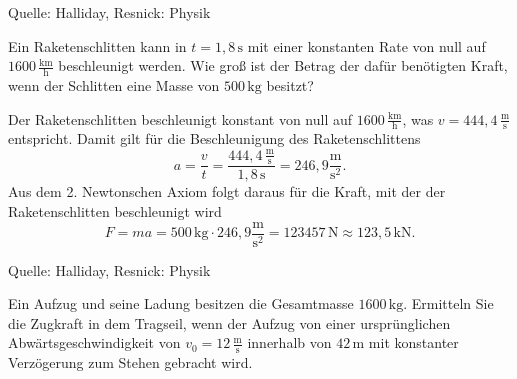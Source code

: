 \begin{MExercises}
\begin{MExercise}
\begin{MSolution}
               \end{MSolution}
               
               Quelle: Halliday, Resnick: Physik
               \end{MExercise}
               
               \begin{MExercise}
               Ein Raketenschlitten kann in $t={1,8} \,\text{s}$ mit einer konstanten Rate von null auf $1600\,\frac{\text{km}}{\text{h}}$ beschleunigt werden. Wie gro{\ss} ist der Betrag der daf\"ur ben\"otigten Kraft, wenn der Schlitten eine Masse von $500\,\text{kg}$ besitzt?
               
               \begin{MSolution}
               Der Raketenschlitten beschleunigt konstant von null auf $1600\,\frac{\text{km}}{\text{h}}$, was $v= 444,4\,\frac{\text{m}}{\text{s}}$ entspricht. Damit gilt f\"ur die Beschleunigung des Raketenschlittens
               $$
               a=\frac{v}{t}=\frac{{444,4}\,\frac{\text{m}}{\text{s}}}{{1,8} \,\text{s}}={246,9}\frac{\text{m}}{\text{s}^2}.
               $$
               Aus dem 2. Newtonschen Axiom folgt daraus f\"ur die Kraft, mit der der Raketenschlitten beschleunigt wird
               $$
               F=ma=500\,\text{kg}\cdot {246,9}\frac{\text{m}}{\text{s}^2}= 123457 \,\text{N}\approx {123,5}\,\text{kN.} 
               $$
               
               
               
               \end{MSolution}
               
               Quelle: Halliday, Resnick: Physik
               \end{MExercise}
               
               \begin{MExercise}
               Ein Aufzug und seine Ladung besitzen die Gesamtmasse $1600\,\text{kg}$. Ermitteln Sie die Zugkraft in dem Tragseil, wenn der Aufzug von einer urspr\"unglichen Abw\"artsgeschwindigkeit von $v_0=12\,\frac{\text{m}}{\text{s}}$ innerhalb von $42 \,\text{m}$ mit konstanter Verz\"ogerung zum Stehen gebracht wird.
               

\end{MExercise}
\end{MExercises}
